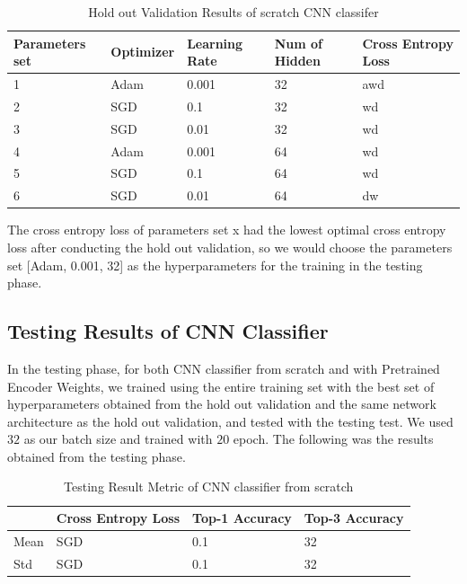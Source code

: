 \documentclass{article}
\begin{document}
\begin{table}[htb]
\caption{Hold out Validation Results of scratch CNN classifer}
	\label{sample-table}
	\centering
\begin{tabular}{lllll}
\toprule
		\cmidrule{1-5}
		Parameters set& Optimizer & Learning Rate & Num of Hidden & Cross Entropy Loss 		\\
		\midrule
 			1 & Adam & 0.001 & 32 & awd \\
 			2 & SGD & 0.1 & 32 &  wd\\
 			3 & SGD & 0.01 & 32 & wd \\
			4 & Adam & 0.001 & 64 & wd \\
 			5 & SGD & 0.1 & 64 &  wd\\
 			6 & SGD & 0.01 & 64 & dw \\
\bottomrule
\end{tabular}
\end{table}

The cross entropy loss of parameters set x had the lowest optimal cross entropy loss after conducting the hold out validation, so we would choose the parameters set [Adam, 0.001, 32] as the hyperparameters for the training in the testing phase.


\subsection{Testing Results of CNN Classifier}

In the testing phase, for both CNN classifier from scratch and with Pretrained Encoder Weights, we trained using the entire training set with the best set of hyperparameters obtained from the hold out validation and the same network architecture as the hold out validation, and tested with the testing test. We used $32$ as our batch size and trained with $20$ epoch. The following was the results obtained from the testing phase.

\begin{table}[htb]
\caption{Testing Result Metric of CNN classifier from scratch}
	\label{sample-table}
	\centering
\begin{tabular}{llll}
\toprule
		\cmidrule{1-4}
		& Cross Entropy Loss & Top-1 Accuracy & Top-3 Accuracy 		\\
	\midrule
 	Mean & SGD & 0.1 & 32 \\
 	Std & SGD & 0.1 & 32\\
\bottomrule
\end{tabular}
\end{table}
\end{document}
